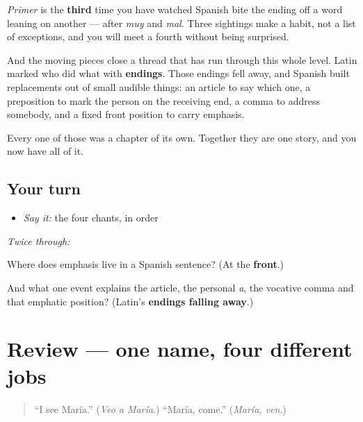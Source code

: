 \begin{grammarlens}[title={Grammar Lens: the thread}]
\emph{Primer} is the \textbf{third} time you have watched Spanish bite the ending off a word leaning on another — after \emph{muy} and \emph{mal}. Three sightings make a habit, not a list of exceptions, and you will meet a fourth without being surprised.

And the moving pieces close a thread that has run through this whole level. Latin marked who did what with \textbf{endings}. Those endings fell away, and Spanish built replacements out of small audible things: an article to say which one, a preposition to mark the person on the receiving end, a comma to address somebody, and a fixed front position to carry emphasis.

Every one of those was a chapter of its own. Together they are one story, and you now have all of it.
\end{grammarlens}

\subsection*{Your turn}
\begin{itemize}
\raggedright
  \item \emph{Say it:} the four chants, in order
\end{itemize}

\emph{Twice through:}

\begin{tcolorbox}[breakable,colback=teal!4,colframe=teal!35!black,title={Before you move on}]
Where does emphasis live in a Spanish sentence? (At the \textbf{front}.)

And what one event explains the article, the personal \emph{a}, the vocative comma and that emphatic position? (Latin's \textbf{endings falling away}.)
\end{tcolorbox}
\section[(review)]{Review — one name, four different jobs}

\label{lesson:ES-C67-repaso-lo-que-reemplazo-los-casos}



\begin{quote}
\textquotedblleft{}I see María.\textquotedblright{} (\emph{Veo a María}.) \textquotedblleft{}María, come.\textquotedblright{} (\emph{María, ven}.)
\end{quote}

